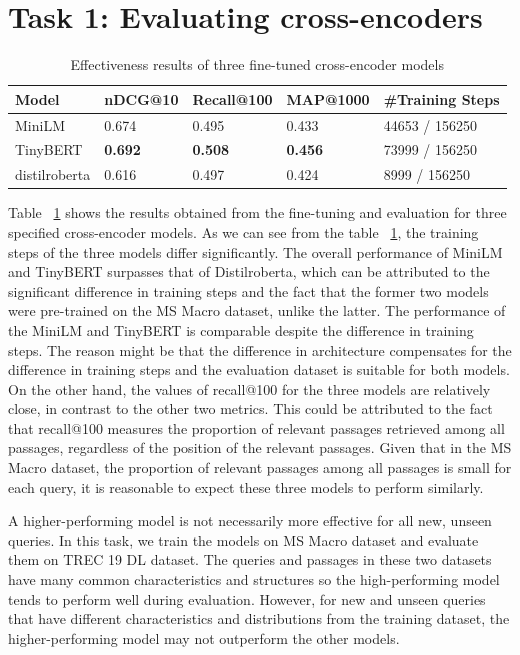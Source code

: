\documentclass[acmsmall]{acmart}
\begin{document}
\section{Task 1: Evaluating cross-encoders}
\begin{table}[!ht]
    \centering
    \caption{Effectiveness results of three fine-tuned cross-encoder models}
    \label{tab:results-task1}
    \begin{tabular}{lllll}
        \toprule
        \textbf{Model} & \textbf{nDCG@10} & \textbf{Recall@100} & \textbf{MAP@1000} & \textbf{\#Training Steps}\\
        \midrule
        MiniLM & 0.674 & 0.495 & 0.433 & 44653 / 156250\\
        TinyBERT & \textbf{0.692} & \textbf{0.508} & \textbf{0.456} & 73999 / 156250\\
        distilroberta & 0.616 & 0.497 & 0.424 & 8999 / 156250\\
        \bottomrule
    \end{tabular}
\end{table}
Table ~\ref{tab:results-task1} shows the results obtained from the fine-tuning and evaluation for three specified cross-encoder models. As we can see from the table ~\ref{tab:results-task1}, the training steps of the three models differ significantly. The overall performance of MiniLM and TinyBERT surpasses that of Distilroberta, which can be attributed to the significant difference in training steps and the fact that the former two models were pre-trained on the MS Macro dataset, unlike the latter. The performance of the MiniLM and TinyBERT is comparable despite the difference in training steps. The reason might be that the difference in architecture compensates for the difference in training steps and the evaluation dataset is suitable for both models. On the other hand, the values of recall@100 for the three models are relatively close, in contrast to the other two metrics. This could be attributed to the fact that recall@100 measures the proportion of relevant passages retrieved among all passages, regardless of the position of the relevant passages. Given that in the MS Macro dataset, the proportion of relevant passages among all passages is small for each query, it is reasonable to expect these three models to perform similarly. 

A higher-performing model is not necessarily more effective for all new, unseen queries. In this task, we train the models on MS Macro dataset and evaluate them on TREC 19 DL dataset. The queries and passages in these two datasets have many common characteristics and structures so the high-performing model tends to perform well during evaluation. However, for new and unseen queries that have different characteristics and distributions from the training dataset, the higher-performing model may not outperform the other models.
\end{document}
